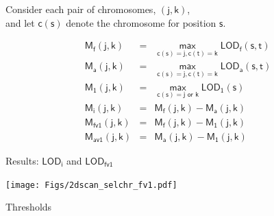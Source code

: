 \documentclass[12pt]{article}
\newcommand{\headsize}{\fontsize{35}{35} \selectfont}
\newcommand{\smallsize}{\fontsize{25}{30} \selectfont}
\newcommand{\smallersize}{\fontsize{20}{25} \selectfont}
\newcommand{\lod}{\text{LOD}}
\newcommand{\M}{\text{M}}
\begin{document}
\vspace{15mm}

\color{mywhite} \smallsize

\hfill \begin{minipage}[t]{10in}
Consider each pair of chromosomes, {\color{myblue} $\mathsf{(j, k)}$}, \\
and let {\color{myblue} $\mathsf{c(s)}$} denote the chromosome for
  position {\color{myblue} $\mathsf{s}$}.

\vspace{5mm}

\hspace{1in}
\begin{minipage}{6in}
{\color{myblue}
\begin{eqnarray*}
\mathsf{\M_f(j,k)}& = &\mathsf{ \max_{c(s)=j, c(t)=k} \lod_f(s,t)} \\[12pt]
\mathsf{\M_a(j,k)}& = &\mathsf{ \max_{c(s)=j, c(t)=k} \lod_a(s,t)} \\[12pt]
\mathsf{\M_1(j,k)}& = &\mathsf{ \max_{c(s)=j \text{ or } k} \lod_1(s)} \\[36pt]
\mathsf{\M_i(j,k)}& = &\mathsf{ \M_f(j,k) - \M_a(j,k)}\\[12pt]
\mathsf{\M_{fv1}(j,k)}& = &\mathsf{ \M_f(j,k) - \M_1(j,k)}\\[12pt]
\mathsf{\M_{av1}(j,k)}& = &\mathsf{ \M_a(j,k) - \M_1(j,k)}
\end{eqnarray*}
}
\end{minipage}
\end{minipage}

\newpage

\headsize \color{myyellow}
\hfill \begin{minipage}{5.75in}
\centering
Results: $\mathsf{\lod_i}$ and $\mathsf{\lod_{fv1}}$
\end{minipage}

\vfill 

\centerline{\texttt{[image: Figs/2dscan\_selchr\_fv1.pdf]}}



\newpage

\headsize \color{myyellow}
\hfill \begin{minipage}{5.75in}
\centering
Thresholds
\end{minipage}

\vspace{20mm}

\color{mywhite} \smallersize
\end{document}

